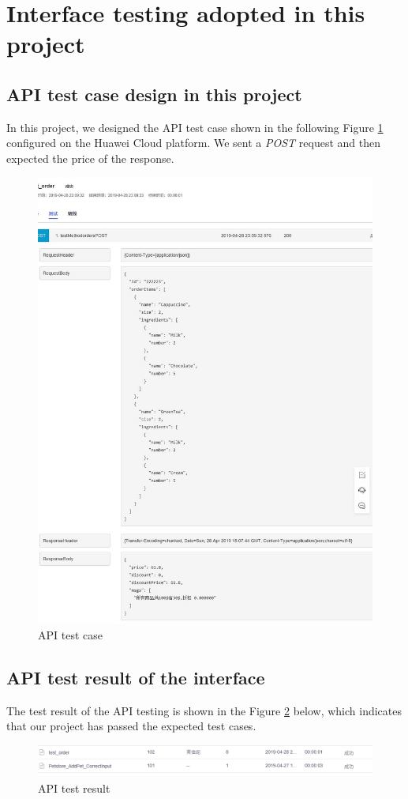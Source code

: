 \documentclass[a4paper]{report}
\begin{document}
\section{Interface testing adopted in this project}
\subsection{API test case design in this project}
In this project, we designed the API test case shown in the following Figure \ref{1} configured on the Huawei Cloud platform. We sent a \emph{POST} request and then expected the price of the response.
\begin{figure}
\includegraphics[scale=0.4]{code.jpg}
 \caption{API test case}\label{1}
\end{figure}
\subsection{API test result of the interface}
The test result of the API testing is shown in the Figure \ref{2} below, which indicates that our project has passed the expected test cases.
\begin{figure}
\includegraphics[scale=0.7]{result.png}
 \caption{API test result}\label{2}
\end{figure}
\end{document}
